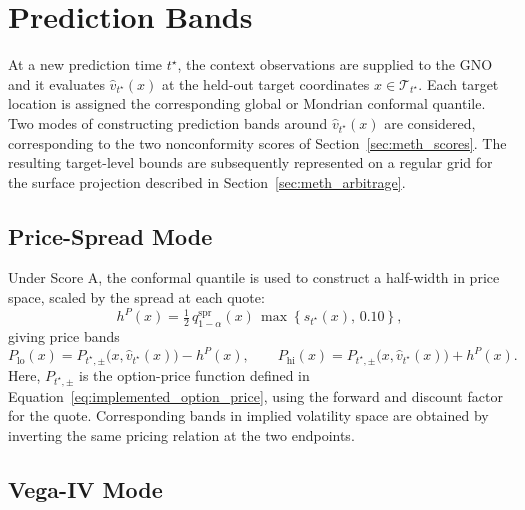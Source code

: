 \section{Prediction Bands}
\label{sec:meth_bands}

At a new prediction time $t^\star$, the context observations are supplied to the GNO and it evaluates $\hat{v}_{t^\star}(x)$ at the held-out target coordinates $x\in\mathcal{T}_{t^\star}$. Each target location is assigned the corresponding global or Mondrian conformal quantile. Two modes of constructing prediction bands around $\hat{v}_{t^\star}(x)$ are considered, corresponding to the two nonconformity scores of Section~\ref{sec:meth_scores}. The resulting target-level bounds are subsequently represented on a regular grid for the surface projection described in Section~\ref{sec:meth_arbitrage}.

\subsection{Price-Spread Mode}
\label{subsec:price_spread_mode}

Under Score A, the conformal quantile is used to construct a half-width in price space, scaled by the spread at each quote:
\begin{equation}
    h^P(x) = \tfrac{1}{2}\, q^{\text{spr}}_{1-\alpha}(x)\,
    \max\!\left\{s_{t^\star}(x),\,0.10\right\},
    \label{eq:price_band_halfwidth}
\end{equation}
giving price bands
\begin{equation}
    P_{\text{lo}}(x) = P_{t^\star,\pm}\big(x,\hat{v}_{t^\star}(x)\big)-h^P(x), \qquad
    P_{\text{hi}}(x) = P_{t^\star,\pm}\big(x,\hat{v}_{t^\star}(x)\big)+h^P(x).
    \label{eq:price_bands}
\end{equation}
Here, $P_{t^\star,\pm}$ is the option-price function defined in Equation~\eqref{eq:implemented_option_price}, using the forward and discount factor for the quote. Corresponding bands in implied volatility space are obtained by inverting the same pricing relation at the two endpoints.

\subsection{Vega-IV Mode}
\label{subsec:vega_iv_mode}

